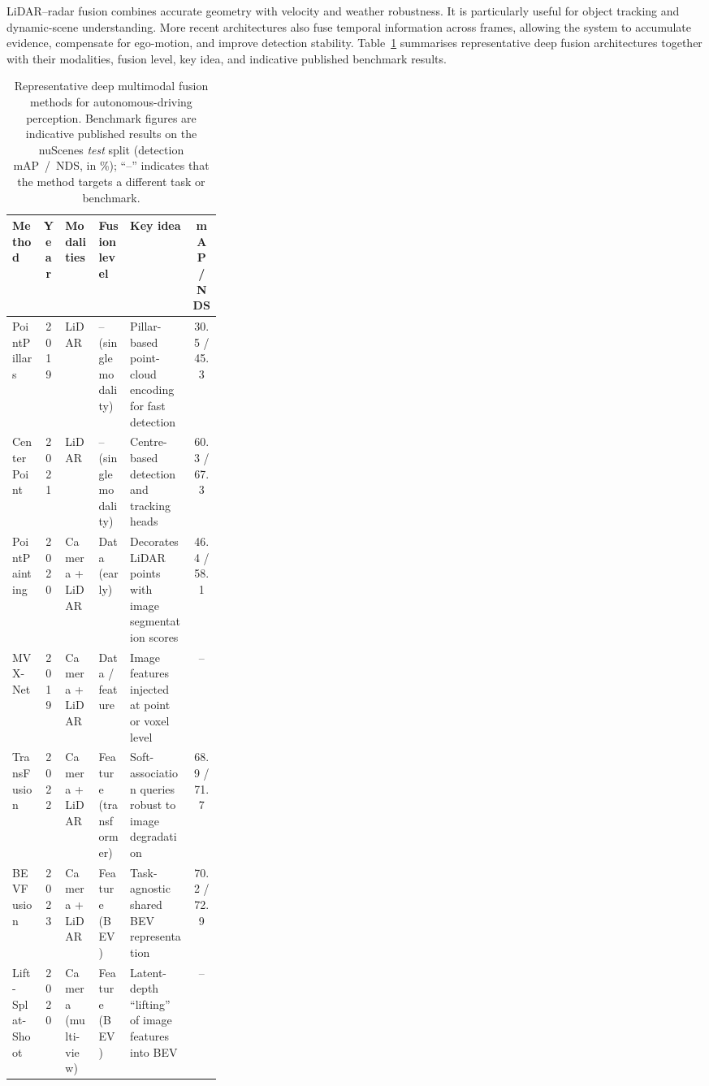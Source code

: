 \documentclass{ieeeaccess}
\newcommand{\added}[1]{\textcolor{RevisionBlue}{#1}}
\begin{document}
LiDAR--radar fusion combines accurate geometry with velocity and weather robustness. It is particularly useful for object tracking and dynamic-scene understanding. More recent architectures also fuse temporal information across frames, allowing the system to accumulate evidence, compensate for ego-motion, and improve detection stability. \added{Table~\ref{tab:deep-fusion-methods} summarises representative deep fusion architectures together with their modalities, fusion level, key idea, and indicative published benchmark results.}

\begin{table}[!t]
    \centering
    \color{blue}
    \small
    \setlength{\tabcolsep}{4pt}
    \caption{\color{blue}Representative deep multimodal fusion methods for autonomous-driving perception. Benchmark figures are indicative published results on the nuScenes \emph{test} split (detection mAP~/~NDS, in \%); ``--'' indicates that the method targets a different task or benchmark.}
    \label{tab:deep-fusion-methods}
    \begin{tabular}{l c l l p{0.30\linewidth} c}
        \hline
        \textbf{Method} & \textbf{Year} & \textbf{Modalities} & \textbf{Fusion level} & \textbf{Key idea} & \textbf{mAP / NDS} \\
        \hline
        PointPillars \cite{lang2019_pointpillars} & 2019 & LiDAR & -- (single modality) & Pillar-based point-cloud encoding for fast detection & 30.5 / 45.3 \\
        CenterPoint \cite{yin2021_centerpoint} & 2021 & LiDAR & -- (single modality) & Centre-based detection and tracking heads & 60.3 / 67.3 \\
        PointPainting \cite{vora2020_pointpainting} & 2020 & Camera + LiDAR & Data (early) & Decorates LiDAR points with image segmentation scores & 46.4 / 58.1 \\
        MVX-Net \cite{sindagi2019_mvxnet} & 2019 & Camera + LiDAR & Data / feature & Image features injected at point or voxel level & -- \\
        TransFusion \cite{bai2022_transfusion} & 2022 & Camera + LiDAR & Feature (transformer) & Soft-association queries robust to image degradation & 68.9 / 71.7 \\
        BEVFusion \cite{liu2023_bevfusion} & 2023 & Camera + LiDAR & Feature (BEV) & Task-agnostic shared BEV representation & 70.2 / 72.9 \\
        Lift-Splat-Shoot \cite{philion2020_lss} & 2020 & Camera (multi-view) & Feature (BEV) & Latent-depth ``lifting'' of image features into BEV & -- \\

\end{tabular}
\end{table}
\end{document}
